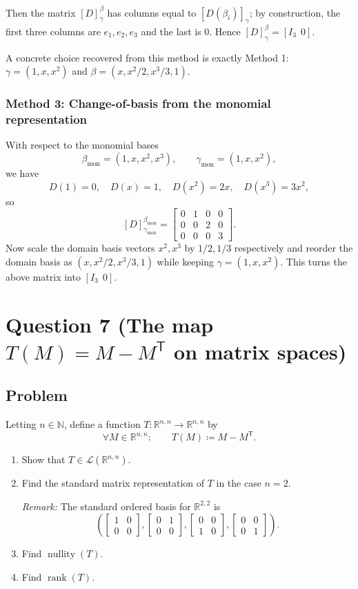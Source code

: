 \documentclass[12pt]{article}
\newcommand{\R}{\mathbb{R}}
\DeclareMathOperator{\rank}{rank}
\DeclareMathOperator{\nullity}{nullity}
\newcommand{\cL}{\mathcal{L}}
\begin{document}
Then the matrix $[D]_\gamma^\beta$ has columns equal to $[D(\beta_i)]_\gamma$; by construction,
the first three columns are $e_1,e_2,e_3$ and the last is $0$.
Hence $[D]_\gamma^\beta=[I_3\ \ 0]$.

\medskip
\noindent A concrete choice recovered from this method is exactly Method 1:
$\gamma=(1,x,x^2)$ and $\beta=(x,x^2/2,x^3/3,1)$.

\subsubsection{Method 3: Change-of-basis from the monomial representation}
With respect to the monomial bases
\[
\beta_{\text{mon}}=(1,x,x^2,x^3),\qquad \gamma_{\text{mon}}=(1,x,x^2),
\]
we have
\[
D(1)=0,\quad D(x)=1,\quad D(x^2)=2x,\quad D(x^3)=3x^2,
\]
so
\[
[D]_{\gamma_{\text{mon}}}^{\beta_{\text{mon}}}
=
\begin{bmatrix}
0&1&0&0\\
0&0&2&0\\
0&0&0&3
\end{bmatrix}.
\]
Now scale the domain basis vectors $x^2,x^3$ by $1/2,1/3$ respectively and reorder the domain basis as
$(x, x^2/2, x^3/3, 1)$ while keeping $\gamma=(1,x,x^2)$. This turns the above matrix into $[I_3\ \ 0]$.

\newpage
\section{Question 7 (The map $T(M)=M-M^{\mathsf{T}}$ on matrix spaces)}
\subsection{Problem}
Letting $n\in\mathbb{N}$, define a function $T:\R^{n,n}\to\R^{n,n}$ by
\[
\forall M\in\R^{n,n}:\qquad T(M)\coloneqq M - M^{\mathsf{T}}.
\]
\begin{enumerate}[label=(\alph*)]
\item Show that $T\in \cL(\R^{n,n})$.
\item Find the standard matrix representation of $T$ in the case $n=2$.

\emph{Remark:} The standard ordered basis for $\R^{2,2}$ is
\[
\left(
\begin{bmatrix}1&0\\0&0\end{bmatrix},
\begin{bmatrix}0&1\\0&0\end{bmatrix},
\begin{bmatrix}0&0\\1&0\end{bmatrix},
\begin{bmatrix}0&0\\0&1\end{bmatrix}
\right).
\]
\item Find $\nullity(T)$.
\item Find $\rank(T)$.
\end{enumerate}
\end{document}

